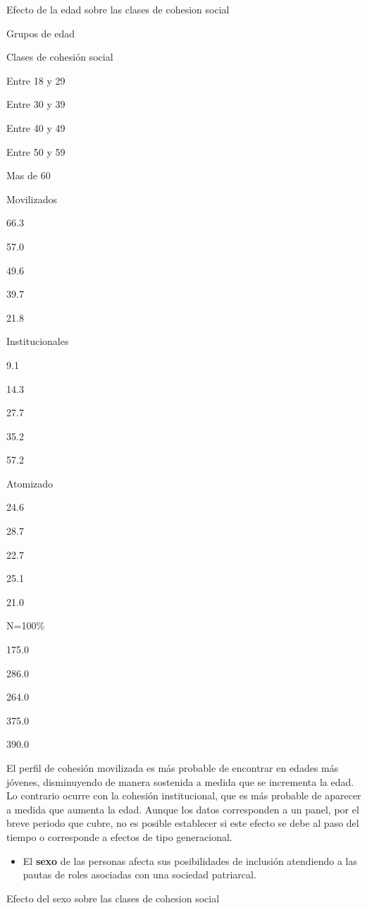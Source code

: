 \documentclass[
  12pt,
]{book}
\providecommand{\tightlist}{%
  \setlength{\itemsep}{0pt}\setlength{\parskip}{0pt}}
\begin{document}
\label{tab:clases-edad}Efecto de la edad sobre las clases de cohesion social

Grupos de edad

Clases de cohesión social

Entre 18 y 29

Entre 30 y 39

Entre 40 y 49

Entre 50 y 59

Mas de 60

Movilizados

66.3

57.0

49.6

39.7

21.8

Institucionales

9.1

14.3

27.7

35.2

57.2

Atomizado

24.6

28.7

22.7

25.1

21.0

N=100\%

175.0

286.0

264.0

375.0

390.0

El perfil de cohesión movilizada es más probable de encontrar en edades más jóvenes, disminuyendo de manera sostenida a medida que se incrementa la edad. Lo contrario ocurre con la cohesión institucional, que es más probable de aparecer a medida que aumenta la edad. Aunque los datos corresponden a un panel, por el breve periodo que cubre, no es posible establecer si este efecto se debe al paso del tiempo o corresponde a efectos de tipo generacional.

\begin{itemize}
\tightlist
\item
  El \textbf{sexo} de las personas afecta sus posibilidades de inclusión atendiendo a las pautas de roles asociadas con una sociedad patriarcal.
\end{itemize}

\label{tab:clases-sexo}Efecto del sexo sobre las clases de cohesion social
\end{document}
